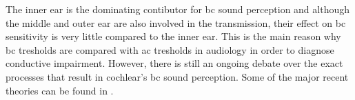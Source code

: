 The inner ear is the dominating contibutor for \gls{bc} sound perception and although the middle and outer ear are also involved in the transmission, their effect on \gls{bc} sensitivity is very little compared to the inner ear. This is the main reason why \gls{bc} tresholds are compared with \gls{ac} tresholds in audiology in order to diagnose conductive impairment. However, there is still an ongoing debate over the exact processes that result in cochlear's \gls{bc} sound perception. Some of the major recent theories can be found in \citep[Sec. 6.3.3]{puria_2013}.
